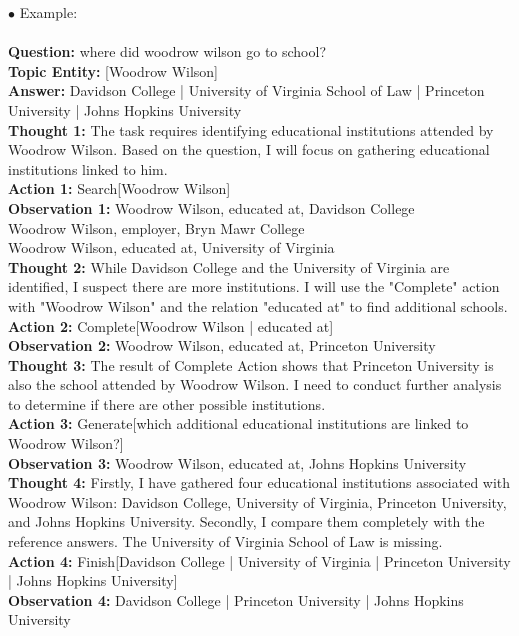 \begin{tcolorbox}[prompt=
{\begin{prompt} \label{prompts for instruction used in knowledge extraction}The Prompt for the Training Phase of JCQL 
\end{prompt}}]
$\bullet$ Example: \\ \\
\textbf{Question:} where did woodrow wilson go to school? \\
\textbf{Topic Entity:} [Woodrow Wilson] \\
\textbf{Answer:} Davidson College | University of Virginia School of Law | Princeton University | Johns Hopkins University \\
\textbf{Thought 1:} The task requires identifying educational institutions attended by Woodrow Wilson. Based on the question, I will focus on gathering educational institutions linked to him. \\
\textbf{Action 1:} Search[Woodrow Wilson] \\
\textbf{Observation 1:} Woodrow Wilson, educated at, \textcolor[rgb]{0,0.4392,0.7529}{Davidson College} \\
Woodrow Wilson, employer, Bryn Mawr College \\
Woodrow Wilson, educated at, University of Virginia \\
\textbf{Thought 2:} While Davidson College and the University of Virginia are identified, I suspect there are more institutions. I will use the "Complete" action with "Woodrow Wilson" and the relation "educated at" to find additional schools. \\
\textbf{Action 2:} \textcolor[rgb]{0.4549,0.7137,0.0078}{Complete[Woodrow Wilson | educated at]} \\
\textbf{Observation 2:} Woodrow Wilson, educated at, \textcolor[rgb]{0,0.4392,0.7529}{Princeton University} \\
\textbf{Thought 3:} The result of Complete Action shows that Princeton University is also the school attended by Woodrow Wilson. I need to conduct further analysis to determine if there are other possible institutions. \\
\textbf{Action 3:} \textcolor[rgb]{0.7529,0,0}{Generate[which additional educational institutions are linked to Woodrow Wilson?]} \\
\textbf{Observation 3:} Woodrow Wilson, educated at, \textcolor[rgb]{0,0.4392,0.7529}{Johns Hopkins University} \\
\textbf{Thought 4:} Firstly, I have gathered four educational institutions associated with Woodrow Wilson: Davidson College, University of Virginia, Princeton University, and Johns Hopkins University. Secondly, I compare them completely with the reference answers. The University of Virginia School of Law is missing. \\
\textbf{Action 4:} Finish[Davidson College | University of Virginia | Princeton University | Johns Hopkins University] \\
\textbf{Observation 4:} Davidson College | Princeton University | Johns Hopkins University
\end{tcolorbox}